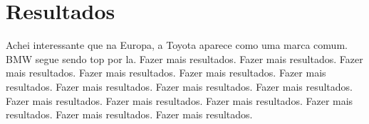 \documentclass[10pt, conference]{IEEEtran}
\begin{document}
\section{Resultados}
%
Achei interessante que na Europa, a Toyota aparece como uma marca comum. BMW segue sendo top por la.
Fazer mais resultados. Fazer mais resultados. Fazer mais resultados. Fazer mais resultados. Fazer mais resultados. 
Fazer mais resultados. Fazer mais resultados. Fazer mais resultados. Fazer mais resultados. Fazer mais resultados. 
Fazer mais resultados. Fazer mais resultados. Fazer mais resultados. Fazer mais resultados. Fazer mais resultados. 




%


%


%


%



%
\end{document}
